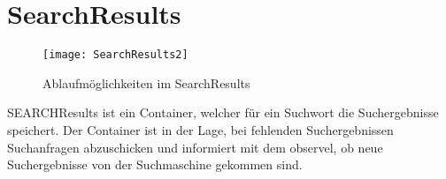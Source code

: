 
\section{SearchResults}
\begin{figure}[htb]
  \centering
  \texttt{[image: SearchResults2]}
  \caption{Ablaufmöglichkeiten im SearchResults}
	\label{fig:Ablaufmöglichkeiten im SearchResults}
\end{figure}

SEARCHResults ist ein Container, welcher für ein Suchwort die Suchergebnisse speichert.
Der Container ist in der Lage, bei fehlenden Suchergebnissen Suchanfragen abzuschicken und informiert mit dem observel, ob neue Suchergebnisse von der Suchmaschine gekommen sind.
